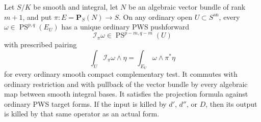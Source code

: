 \begin{theorem}
\label{r15ps:projective-bundle}
Let $S/K$ be smooth and integral, let $N$ be an algebraic vector
bundle of rank $m+1$, and put
$\pi:E=\mathbf P_S(N)\to S$.  On any ordinary open
$U\subset S^{\mathrm{an}}$, every
$\omega\in\operatorname{PS}^{p,q}(E_U)$ has a unique ordinary
PWS pushforward
\[
 \mathcal I_\pi\omega\in\operatorname{PS}^{p-m,q-m}(U)
\tag{PS15.8}\label{r15ps:bundle-output}
\]
with prescribed pairing
\[
 \int_U\mathcal I_\pi\omega\wedge\eta
                    =\int_{E_U}\omega\wedge\pi^*\eta
\tag{PS15.9}\label{r15ps:bundle-pairing}
\]
for every ordinary smooth compact complementary test.
It commutes with ordinary restriction and with pullback of
the vector bundle by every algebraic map between smooth
integral bases.  It satisfies the projection formula against
ordinary PWS target forms.  If the input is killed by
$d'$, $d''$, or $D$, then its output is killed by that same
operator as an actual form.
\end{theorem}

